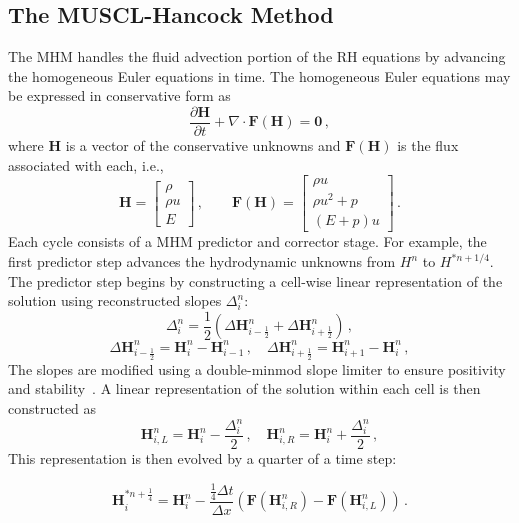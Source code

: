 \documentclass[preprint,12pt]{elsarticle}
\newcommand{\dydt}[1]{\frac{\partial #1}{\partial t}}
\newcommand{\pec}{\, ,}
\newcommand{\pep}{\, .}
\newcommand{\half}{\frac{1}{2}}
\newcommand{\fourth}{\frac{1}{4}}
\newcommand{\E}{{E_r}}
\renewcommand{\H}{\mathbf{H}}
\newcommand{\Flux}{\mathbf{F}}
\newcommand{\dt}{\Delta t}
\newcommand{\dx}{\Delta x}
\newcommand{\iL}{_{i,L}}
\newcommand{\iR}{_{i,R}}
\newcommand{\hydroPredictor}[4]{
\begin{equation}#4
  \H_i^{#2} = \H_i^{#1} - \frac{#3\dt}{\dx}
  \left(\Flux(\H\iR^{#1}) - \Flux(\H\iL^{#1})\right) \pep
\end{equation}
}
\begin{document}
\subsection{The MUSCL-Hancock Method}

The MHM handles the fluid advection portion of the RH equations by advancing the homogeneous Euler equations
in time.   The homogeneous Euler equations may be expressed in conservative form as
\begin{equation}
  \dydt{\H} + \nabla\cdot\Flux(\H) = \mathbf{0} \pec
\end{equation}
where $\H$ is a vector of the conservative unknowns
and $\Flux(\H)$ is the flux associated with each, i.e.,
\begin{equation}
  \H=\left[\begin{array}{c}\rho\\\rho u\\E\end{array}\right] \pec\qquad
  \Flux(\H)=\left[\begin{array}{c}\rho u\\
  \rho u^2 + p\\
  (E+p)u\end{array}\right] \pep
\end{equation}
Each cycle consists of a MHM predictor and corrector stage. For example, the first predictor step advances the hydrodynamic unknowns
from $H^{n}$ to $H^{*n+1/4}$.
The predictor step begins by constructing a cell-wise linear representation of the solution
using reconstructed slopes $\Delta_i^n$:
\begin{equation}\label{eq:muscl_slopes}
  \Delta_i^n = \half\left(\Delta\H_{i-\half}^n + \Delta\H_{i+\half}^n\right) \pec
\end{equation}
\begin{equation}\label{eq:muscl_differences}
  \Delta\H_{i-\half}^n = \H_i^n - \H_{i-1}^n \pec\quad
  \Delta\H_{i+\half}^n = \H_{i+1}^n - \H_i^n \pec
\end{equation}
The slopes are modified using a double-minmod slope
limiter to ensure positivity and stability~\cite{mclow2008}.
A linear representation
of the solution within each cell is then constructed as
\begin{equation}\label{eq:edge_hydro}
  \H\iL^n = \H_i^n - \frac{{\Delta}_i^n}{2} \pec
  \quad
  \H\iR^n = \H_i^n + \frac{{\Delta}_i^n}{2} \pec
\end{equation}
This representation is then evolved by a quarter of a time step:
\hydroPredictor{n}{*n+\fourth}{\fourth}{\label{eq:muscl_predictor}}
\end{document}
